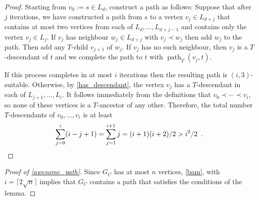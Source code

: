 \documentclass{patmorin}
\DeclareMathOperator{\pth}{path}
\begin{document}
\begin{proof}
  Starting from $v_0:=s\in L_d$, construct a path as follows:  Suppose that after $j$ iterations, we have constructed a path from $s$ to a vertex $v_j\in L_{d+j}$ that contains at most two vertices from each of $L_d,\ldots,L_{d+j-1}$ and contains only the vertex $v_j\in L_j$.  If $v_j$ has neighbour $w_j\in L_{d+j}$ with $v_j\prec w_j$ then add $w_j$ to the path.  Then add any $T$-child $v_{j+1}$ of $w_j$.  If $v_j$ has no such neighbour, then $v_j$ is a $T$-descendant of $t$ and we complete the path to $t$ with $\pth_T(v_j,t)$.

  If this process completes in at most $i$ iterations then the resulting path is $(i,3)$-suitable.  Otherwise, by \cref{has_descendant}, the vertex $v_j$ has a $T$-descendant in each of $L_{j+1},\ldots,L_i$. It follows immediately from the definitions that $v_0\prec\cdots\prec v_i$, so none of these vertices is a $T$-ancestor of any other.  Therefore, the total number $T$-descendants of $v_0,\ldots,v_i$ is at least
  \[
    \sum_{j=0}^i (i-j+1) = \sum_{j=1}^{i+1} j = (i+1)(i+2)/2 > i^2/2 \enspace .
    \qedhere
  \]
\end{proof}

\begin{proof}[Proof of \cref{awesome_path}]
  Since $G_C$ has at most $n$ vertices, \cref{bam}, with $i=\lceil 2\sqrt{n}\rceil$ implies that $G_C$ contains a path that satisfies the conditions of the lemma.
\end{proof}




\end{document}

